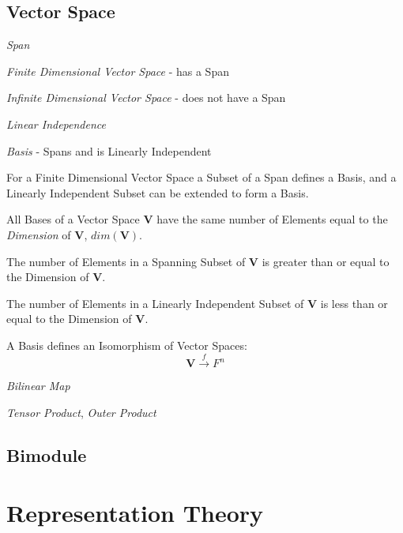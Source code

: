\subsection{Vector Space}\label{sec:vector_space}

\emph{Span}

\emph{Finite Dimensional Vector Space} - has a Span

\emph{Infinite Dimensional Vector Space} - does not have a Span

\emph{Linear Independence}

\emph{Basis} - Spans and is Linearly Independent

For a Finite Dimensional Vector Space a Subset of a Span defines a
Basis, and a Linearly Independent Subset can be extended to form a
Basis.

All Bases of a Vector Space $\mathbf{V}$ have the same number of
Elements equal to the \emph{Dimension} of $\mathbf{V}$,
$dim(\mathbf{V})$.

The number of Elements in a Spanning Subset of $\mathbf{V}$ is greater
than or equal to the Dimension of $\mathbf{V}$.

The number of Elements in a Linearly Independent Subset of
$\mathbf{V}$ is less than or equal to the Dimension of $\mathbf{V}$.

A Basis defines an Isomorphism of Vector Spaces:
\[
    \mathbf{V} \xrightarrow{f} F^n
\]

\emph{Bilinear Map}

\emph{Tensor Product}, \emph{Outer Product}




\subsection{Bimodule}\label{sec:bimodule}



\section{Representation Theory}

